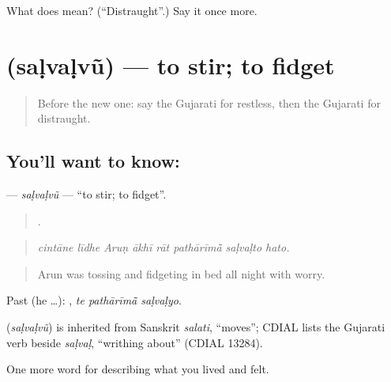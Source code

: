 \begin{tcolorbox}[breakable,colback=teal!4,colframe=teal!35!black,title={Before you move on}]
What does  mean? (\textquotedblleft{}Distraught\textquotedblright{}.) Say it once more.
\end{tcolorbox}
\section[\texorpdfstring{\gu{સળવળવું} (saḷvaḷvũ)}{સળવળવું (saḷvaḷvũ)}]{ (saḷvaḷvũ) — to stir; to fidget}

\label{lesson:GU-C454-salvalvu}



\begin{quote}
Before the new one: say the Gujarati for restless, then the Gujarati for distraught.
\end{quote}

\subsection*{You'll want to know: }
\textbf{} — \emph{saḷvaḷvũ} — \textquotedblleft{}to stir; to fidget\textquotedblright{}.

\begin{quote}
       .
\end{quote}

\begin{quote}
\emph{cintāne līdhe Aruṇ ākhī rāt pathārīmā̃ saḷvaḷto hato.}
\end{quote}

\begin{quote}
Arun was tossing and fidgeting in bed all night with worry.
\end{quote}

Past (he …):   , \emph{te pathārīmā̃ saḷvaḷyo}.

\begin{cousinweb}
\textbf{} (\emph{saḷvaḷvũ}) is inherited from Sanskrit \emph{salati}, \textquotedblleft{}moves\textquotedblright{}; CDIAL lists the Gujarati verb beside \emph{saḷvaḷ}, \textquotedblleft{}writhing about\textquotedblright{} (CDIAL 13284).
\end{cousinweb}

\begin{grammarlens}[title={What you've built}]
One more word for describing what you lived and felt.
\end{grammarlens}

